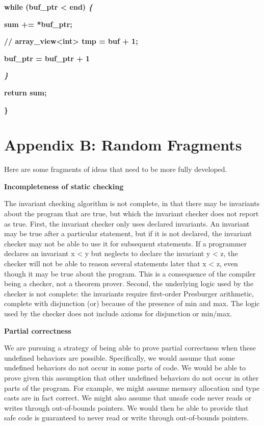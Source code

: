 \documentclass[]{article}
\begin{document}
\textbf{while (buf\_ptr \textless{} end) \emph{\{}}

\textbf{sum += *buf\_ptr;}

\textbf{// array\_view\textless{}int\textgreater{} tmp = buf + 1;}

\textbf{buf\_ptr = buf\_ptr + 1}

\emph{\textbf{\}}}

\textbf{return sum;}

\textbf{\}}

\section{\texorpdfstring{\protect\hypertarget{ux5fToc420589215}{}{\protect\hypertarget{ux5fToc422907014}{}{\protect\hypertarget{ux5fToc424307743}{}{\protect\hypertarget{ux5fToc426641146}{}{\protect\hypertarget{ux5fToc435435022}{}{\protect\hypertarget{ux5fToc437460857}{}{\protect\hypertarget{ux5fToc440445538}{}{\protect\hypertarget{ux5fToc440449320}{}{\protect\hypertarget{ux5fToc440551970}{}{}}}}}}}}}Appendix
B: Random
Fragments}{Appendix B: Random Fragments}}\label{appendix-b-random-fragments}

Here are some fragments of ideas that need to be more fully developed.

\textbf{Incompleteness of static checking}

The invariant checking algorithm is not complete, in that there may be
invariants about the program that are true, but which the invariant
checker does not report as true. First, the invariant checker only uses
declared invariants. An invariant may be true after a particular
statement, but if it is not declared, the invariant checker may not be
able to use it for subsequent statements. If a programmer declares an
invariant x \textless{} y but neglects to declare the invariant y
\textless{} z, the checker will not be able to reason several statements
later that x \textless{} z, even though it may be true about the
program. This is a consequence of the compiler being a checker, not a
theorem prover. Second, the underlying logic used by the checker is not
complete: the invariants require first-order Presburger arithmetic,
complete with disjunction (or) because of the presence of min and max.
The logic used by the checker does not include axioms for disjunction or
min/max.

\textbf{Partial correctness}

We are pursuing a strategy of being able to prove partial correctness
when these undefined behaviors are possible. Specifically, we would
assume that some undefined behaviors do not occur in some parts of code.
We would be able to prove given this assumption that other undefined
behaviors do not occur in other parts of the program. For example, we
might assume memory allocation and type casts are in fact correct. We
might also assume that unsafe code never reads or writes through
out-of-bounds pointers. We would then be able to provide that safe code
is guaranteed to never read or write through out-of-bounds pointers.
\end{document}
